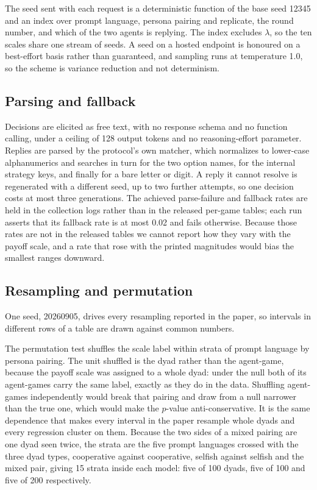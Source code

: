 \documentclass[11pt,a4paper]{article}
\newcommand{\lam}{\lambda}
\begin{document}
The seed sent with each request is a deterministic function
of the base seed 12345 and an index over prompt language, persona pairing and
replicate, the round number, and which of the two agents is replying. The index
excludes $\lam$, so the ten scales share one stream of seeds. A seed on a hosted
endpoint is honoured on a best-effort basis rather than guaranteed, and sampling
runs at temperature 1.0, so the scheme is variance reduction and not
determinism.

\subsection{Parsing and fallback}

Decisions are elicited as free text, with no response schema and no function
calling, under a ceiling of 128 output tokens and no reasoning-effort parameter.
Replies are parsed by the protocol's own matcher, which normalizes to lower-case alphanumerics and searches in turn for
the two option names, for the internal strategy keys, and finally for a bare
letter or digit. A reply it cannot resolve is regenerated with a different seed,
up to two further attempts, so one decision costs at most three generations. The
achieved parse-failure and fallback rates are held in the collection logs rather
than in the released per-game tables; each run asserts that its fallback rate is
at most 0.02 and fails otherwise. Because those rates are not in the released
tables we cannot report how they vary with the payoff scale, and a rate that
rose with the printed magnitudes would bias the smallest ranges downward.

\subsection{Resampling and permutation}

One seed, 20260905, drives every
resampling reported in the paper, so intervals in different rows of a table are
drawn against common numbers.

The permutation test shuffles the scale label within strata of prompt language
by persona pairing. The unit shuffled is the dyad rather than the agent-game,
because the payoff scale was assigned to a whole dyad: under the null both of
its agent-games carry the same label, exactly as they do in the data. Shuffling
agent-games independently would break that pairing and draw from a null
narrower than the true one, which would make the $p$-value anti-conservative.
It is the same dependence that makes every interval in the paper resample whole
dyads and every regression cluster on them. Because the two sides of a mixed
pairing are one dyad seen twice, the strata are the five prompt languages
crossed with the three dyad types, cooperative against cooperative, selfish
against selfish and the mixed pair, giving 15 strata inside each model: five of
100 dyads, five of 100 and five of 200 respectively.
\end{document}
